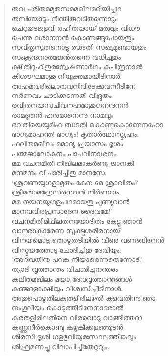 \begin{verse}
തവ ചരിതമമൃതസമമഖിലമറിയിച്ചഥ\\
തമ്പിയോടും നിന്തിരുവടിതന്നൊടും\\
ചെറുതുടജഭുവി രഹിതയായ് മരുവും വിധൗ\\
ചെന്നു ദശാനനന്‍ കൊണ്ടങ്ങുപോയതും\\
സവിതൃസുതനൊടൂ ഝടതി സഖ്യമുണ്ടായതും\\
സംക്രന്ദനാത്മജന്‍തന്നെ വധിച്ചതും\\
ക്ഷിതിദുഹിതുരന്വേഷണാര്‍ഥം കപീന്ദ്രനാല്‍\\
കീശൗഘമാശു നിയുക്തമായീടിനാര്‍.\\
അഹമവരിലൊരുവനിവിടേക്കുവന്നീടിനേ-\\
നര്‍ണവം ചാടിക്കടന്നതി വിദ്രുതം\\
രവിതനയസചിവനഹമാശുഗനന്ദനന്‍\\
രാമദൂതന്‍ ഹനുമാനെന്നു നാമവും\\
ഭവതിയെയുമിഹ ഝടതി കൊണ്ടുകൊണ്ടേനഹോ\\
ഭാഗ്യമാഹന്ത! ഭാഗ്യം! കൃതാര്‍ഥോസ്മ്യഹം.\\
ഫലിതമഖിലം മമാദ്യ പ്രയാസം ഭൃശം\\
പത്മജാലോകനം പാപവിനാശനം.\\
മമ വചനമിതി നിഖിലമാകര്‍ണ്യ ജാനകി\\
മന്ദമന്ദം വിചാരിച്ചിതു മാനസേ.\\
‘ശ്രവണയുഗളാമൃതം കേന മേ ശ്രാവിതം?\\
ശ്രീമതാമഗ്രേസരനവന്‍ നിര്‍ണയം.\\
മമ നയനയുഗളപഥമായതു പുണ്യവാന്‍\\
മാനവവീരപ്രസാദേന ദൈവമേ!’\\
വചനമിതിമിഥിലതനയോദിതം കേട്ടു ഞാന്‍\\
വാനരാകാരേണ സൂക്ഷ്മശരീരനായ്\\
വിനയമൊടു തൊഴുതടിയില്‍ വീണു വണങ്ങിനേന്‍\\
വിസ്മയത്തോടു ചോദിച്ചിതു ദേവിയും:\\
‘അറിവതിനു പറക നീയാരെന്നതെന്നോടി’-\\
ത്യാദി വൃത്താന്തം വിചാരിച്ചനന്തരം\\
കഥിതമഖിലം മയാ ദേവവൃത്താന്തങ്ങള്‍\\
കഞ്ജദളാക്ഷിയും വിശ്വസിച്ചീടിനാള്‍.\\
അതുപൊഴുതിലകതളിരിലഴല്‍ കളവതിന്നു ഞാ-\\
നംഗുലീയം കൊടുത്തീടിനേനാദരാല്‍\\
കരതളിരിലതിനെ വിരവൊടു വാങ്ങിത്തദാ\\
കണ്ണുനീര്‍കൊണ്ടു കഴുകിക്കളഞ്ഞുടന്‍\\
ശിരസി ദൃശി ഗളഭുവിയുരഃസ്ഥലത്തിങ്കലും\\
ശീഘ്രമണച്ചു വിലാപിച്ചിതേറ്റവും.\\

\end{verse}
